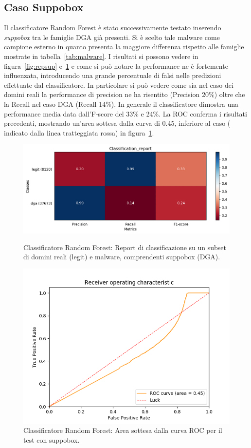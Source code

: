\newpage
\subsection{Caso Suppobox}
Il classificatore Random Forest è stato successivamente testato inserendo \textit{suppobox} tra le famiglie DGA già presenti. Si è scelto tale malware come campione esterno in quanto presenta la maggiore differenza rispetto alle famiglie mostrate in tabella~\ref{tab:malware}. I risultati si possono vedere in figura~\ref{fig:repsup} e~\ref{fig:rocsup} e come si può notare la performance ne è fortemente influenzata, introducendo una grande percentuale di falsi nelle predizioni effettuate dal classificatore. In particolare si può vedere come sia nel caso dei domini reali la performance di precision ne ha risentito (Precision 20\%) oltre che la Recall nel caso DGA (Recall 14\%). In generale il classificatore dimostra una performance media data dall'F-score del 33\% e 24\%. 
La ROC conferma i risultati precedenti, mostrando un'area sottesa dalla curva di 0.45, inferiore al caso ( indicato dalla linea tratteggiata rossa) in figura~\ref{fig:rocsup}.

\begin{figure}[!bp]
    \centering
    \includegraphics[width=\columnwidth]{figures/rndf_tra_nosup_sup/class_rep.png}
    \caption{Classificatore Random Forest: Report di classificazione su un subset di domini reali (legit) e malware, comprendenti suppobox (DGA).\label{fig:repsup}}
    \centering
    \includegraphics[width=\columnwidth]{figures/rndf_tra_nosup_sup/roc_plot.png}
    \caption{Classificatore Random Forest: Area sottesa dalla curva ROC per il test con  suppobox.\label{fig:rocsup}}
\end{figure}

